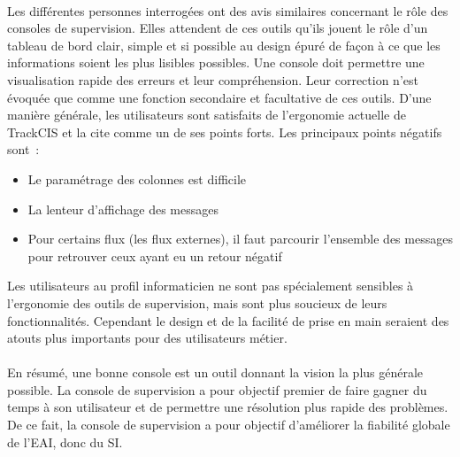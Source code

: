 			\paragraph{}%
			Les différentes personnes interrogées ont des avis similaires concernant le
			rôle des consoles de supervision. Elles attendent
			de ces outils qu’ils jouent le rôle d'un tableau de bord clair, simple et si
			possible au design épuré de façon à ce que les informations soient les plus
			lisibles possibles. Une console doit permettre une visualisation rapide des
			erreurs et leur compréhension. Leur correction n’est évoquée que comme une
			fonction secondaire et facultative de ces outils.\newline
			D’une manière générale, les utilisateurs sont satisfaits de l’ergonomie
			actuelle de TrackCIS et la cite comme un de ses points forts.
			Les principaux points négatifs sont~:
			\begin{itemize}
			  \item Le paramétrage des colonnes est difficile
			  \item La lenteur d’affichage des messages
			  \item Pour certains flux  (les flux externes), il faut parcourir l'ensemble
			  des messages pour retrouver ceux ayant eu un retour négatif
			\end{itemize}
			Les utilisateurs au profil informaticien ne sont pas spécialement sensibles
			à l’ergonomie des outils de supervision, mais sont plus soucieux de leurs
			fonctionnalités. Cependant le design et de la facilité de prise en main
			seraient des atouts plus importants pour des utilisateurs métier.
			
			\paragraph{}%
			En résumé, une bonne console est un outil donnant la vision la plus générale
			possible. La console de supervision a pour objectif premier de faire gagner
			du temps à son utilisateur et de permettre une résolution plus rapide des
			problèmes. De ce fait, la console de supervision a pour objectif d’améliorer
			la fiabilité globale de l’EAI, donc du SI.
			

